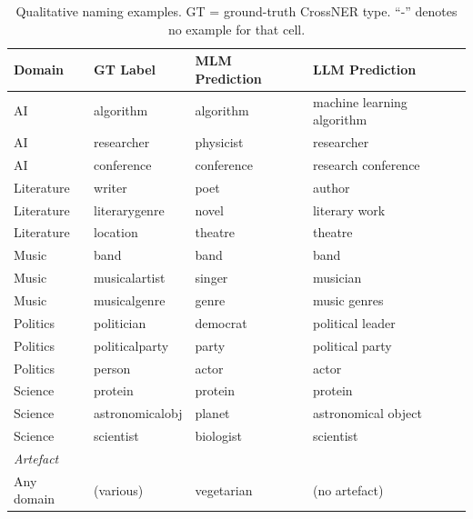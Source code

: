 \documentclass[11pt,a4paper]{article}
\begin{document}
\begin{table}[H]
\centering
\footnotesize
\caption{Qualitative naming examples. GT = ground-truth CrossNER type. ``-'' denotes no example for that cell.}
\label{tab:qual}
\begin{tabular}{l|l|l|l}
\toprule
\textbf{Domain} & \textbf{GT Label} & \textbf{MLM Prediction} & \textbf{LLM Prediction} \\
\midrule
AI         & algorithm        & algorithm     & machine learning algorithm \\
AI         & researcher       & physicist     & researcher \\
AI         & conference       & conference    & research conference \\
\midrule
Literature & writer           & poet          & author \\
Literature & literarygenre    & novel         & literary work \\
Literature & location         & theatre       & theatre \\
\midrule
Music      & band             & band          & band \\
Music      & musicalartist    & singer        & musician \\
Music      & musicalgenre     & genre         & music genres \\
\midrule
Politics   & politician       & democrat      & political leader \\
Politics   & politicalparty   & party         & political party \\
Politics   & person           & actor         & actor \\
\midrule
Science    & protein          & protein       & protein \\
Science    & astronomicalobj  & planet        & astronomical object \\
Science    & scientist        & biologist     & scientist \\
\midrule
\multicolumn{4}{l}{\textit{Artefact}} \\
Any domain & (various)        & vegetarian    & (no artefact) \\
\bottomrule
\end{tabular}
\end{table}
\end{document}
